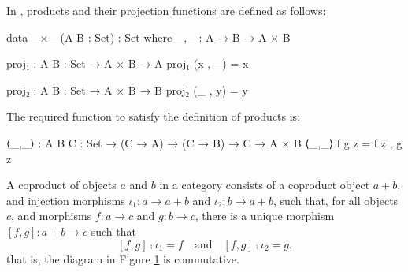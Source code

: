 \begin{example}
  \label{ex:product-agda}

  In \agda, products and their projection functions are defined as
  follows:
  \begin{codeagda}
data _×_ (A B : Set) : Set where
  _,_ : A → B → A × B

proj₁ : {A B : Set} → A × B → A
proj₁ (x , _) = x

proj₂ : {A B : Set} → A × B → B
proj₂ (_ , y) = y
  \end{codeagda}
  The required function to satisfy the definition of products is:
  \begin{codeagda}
⟨_,_⟩ : {A B C : Set} → (C → A) → (C → B) → C → A × B
⟨_,_⟩ f g z = f z , g z
  \end{codeagda}

\end{example}

\begin{definition}
  \label{def:coproduct}


  A coproduct of objects $a$ and $b$ in a category  consists of
  a coproduct object $a + b$, and injection morphisms $\iota_{1}: a
  \to a + b$ and $\iota_{2}: b \to a + b$, such that, for all objects
  $c$, and morphisms $f: a \to c$ and $g: b \to c$, there is a unique
  morphism $[f,g]: a + b \to c$ such that
  \begin{equation}
    \label{eq:coproduct}
    [f,g] \comp \iota_{1} = f
    \quad
    \text{and}
    \quad
    [f,g] \comp \iota_{2} = g
    \text{,}
  \end{equation}
  that is, the diagram in Figure \ref{fig:coproduct} is commutative.

  \begin{figure}[htb]
    \begin{center}
    \end{center}
    \caption{}
    \label{fig:coproduct}
  \end{figure}

\end{definition}

